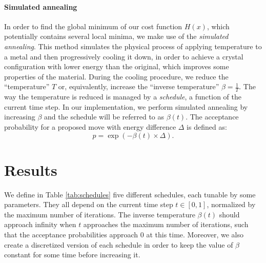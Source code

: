 \documentclass{article}
\begin{document}
  \paragraph{Simulated annealing}
  In order to find the global minimum of our cost function $H(x)$, which potentially contains several local minima, we make use of the \textit{simulated annealing}. This method simulates the physical process of applying temperature to a metal and then progressively cooling it down, in order to achieve a crystal configuration with lower energy than the original, which improves some properties of the material. During the cooling procedure, we reduce the ``temperature'' $T$ or, equivalently, increase the ``inverse temperature'' $\beta=\frac{1}{T}$. The way the temperature is reduced is managed by a \emph{schedule}, a function of the current time step. In our implementation, we perform simulated annealing by increasing $\beta$ and the schedule will be referred to as $\beta(t)$. The acceptance probability for a proposed move with energy difference $\Delta$ is defined as:
  \[
    p = \exp(- \beta(t) \times \Delta).
  \]

  \section*{Results}

  We define in Table \ref{tab:schedules} five different schedules, each tunable by some parameters. They all depend on the current time step $t \in [0, 1]$, normalized by the maximum number of iterations. The inverse temperature $\beta(t)$ should approach infinity when $t$ approaches the maximum number of iterations, such that the acceptance probabilities approach $0$ at this time. Moreover, we also create a discretized version of each schedule in order to keep the value of $\beta$ constant for some time before increasing it.
   
\end{document}
